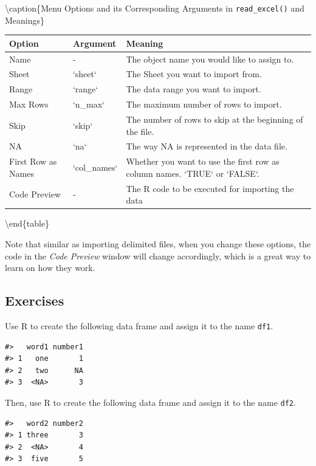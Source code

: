 \documentclass[
]{book}
\begin{document}
\textbackslash caption\{\label{tab:importExcelOptions}Menu Options and its Corresponding Arguments in \texttt{read\_excel()} and Meanings\}
\centering

\begin{tabular}[t]{l|l|l}
\hline
Option & Argument & Meaning\\
\hline
Name & - & The object name you would like to assign to.\\
\hline
Sheet & `sheet` & The Sheet you want to import from.\\
\hline
Range & `range` & The data range you want to import.\\
\hline
Max Rows & `n\_max` & The maximum number of rows to import.\\
\hline
Skip & `skip` & The number of rows to skip at the beginning of the file.\\
\hline
NA & `na` & The way NA is represented in the data file.\\
\hline
First Row as Names & `col\_names` & Whether you want to use the first row as column names. `TRUE` or `FALSE`.\\
\hline
Code Preview & - & The R code to be executed for importing the data\\
\hline
\end{tabular}

\textbackslash end\{table\}

Note that similar as importing delimited files, when you change these options, the code in the \emph{Code Preview} window will change accordingly, which is a great way to learn on how they work.

\hypertarget{exercises-29}{%
\subsection{Exercises}\label{exercises-29}}

Use R to create the following data frame and assign it to the name \texttt{df1}.

\begin{verbatim}
#>   word1 number1
#> 1   one       1
#> 2   two      NA
#> 3  <NA>       3
\end{verbatim}

Then, use R to create the following data frame and assign it to the name \texttt{df2}.

\begin{verbatim}
#>   word2 number2
#> 1 three       3
#> 2  <NA>       4
#> 3  five       5
\end{verbatim}
\end{document}
